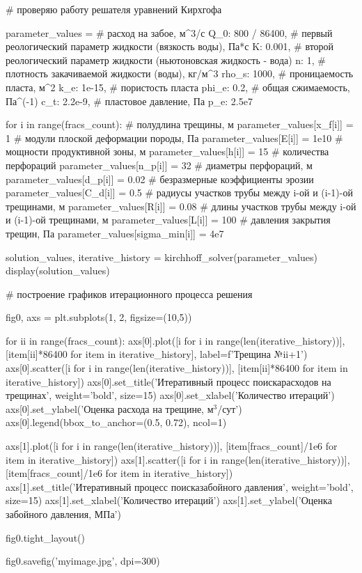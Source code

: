 \begin{pythoncode}
# проверяю работу решателя уравнений Кирхгофа

parameter_values = {
    # расход на забое, м^3/с
    Q_0: 800 / 86400,
    # первый реологический параметр жидкости (вязкость воды), Па*с
    K: 0.001,
    # второй реологический параметр жидкости (ньютоновская жидкость - вода)
    n: 1,
    # плотность закачиваемой жидкости (воды), кг/м^3
    rho_s: 1000,
    # проницаемость пласта, м^2
    k_e: 1e-15,
    # пористость пласта
    phi_e: 0.2,
    # общая сжимаемость, Па^(-1)
    c_t: 2.2e-9,
    # пластовое давление, Па
    p_e: 2.5e7
}

for i in range(fracs_count):
    # полудлина трещины, м
    parameter_values[x_f[i]] = 1
    # модули плоской деформации породы, Па
    parameter_values[E[i]] = 1e10
    # мощности продуктивной зоны, м
    parameter_values[h[i]] = 15
    # количества перфораций
    parameter_values[n_p[i]] = 32
    # диаметры перфораций, м
    parameter_values[d_p[i]] = 0.02
    # безразмерные коэффициенты эрозии
    parameter_values[C_d[i]] = 0.5
    # радиусы участков трубы между i-ой и (i-1)-ой трещинами, м
    parameter_values[R[i]] = 0.08
    # длины участков трубы между i-ой и (i-1)-ой трещинами, м
    parameter_values[L[i]] = 100
    # давления закрытия трещин, Па
    parameter_values[sigma_min[i]] = 4e7

solution_values, iterative_history = kirchhoff_solver(parameter_values)
display(solution_values)
\end{pythoncode}


\begin{pythoncode}
# построение графиков итерационного процесса решения

fig0, axs = plt.subplots(1, 2, figsize=(10,5))

for ii in range(fracs_count):
    axs[0].plot([i for i in range(len(iterative_history))],
                [item[ii]*86400 for item in iterative_history],
                label=f'Трещина №{ii+1}')
    axs[0].scatter([i for i in range(len(iterative_history))],
                   [item[ii]*86400 for item in iterative_history])
axs[0].set_title('Итеративный процесс поиска\n расходов на трещинах',
                 weight='bold',
                 size=15)
axs[0].set_xlabel('Количество итераций')
axs[0].set_ylabel('Оценка расхода на трещине, м$^3$/сут')
axs[0].legend(bbox_to_anchor=(0.5, 0.72), ncol=1)

axs[1].plot([i for i in range(len(iterative_history))],
            [item[fracs_count]/1e6 for item in iterative_history])
axs[1].scatter([i for i in range(len(iterative_history))],
               [item[fracs_count]/1e6 for item in iterative_history])
axs[1].set_title('Итеративный процесс поиска\n забойного давления',
                 weight='bold',
                 size=15)
axs[1].set_xlabel('Количество итераций')
axs[1].set_ylabel('Оценка забойного давления, МПа')

fig0.tight_layout()

fig0.savefig('myimage.jpg', dpi=300)
\end{pythoncode}


